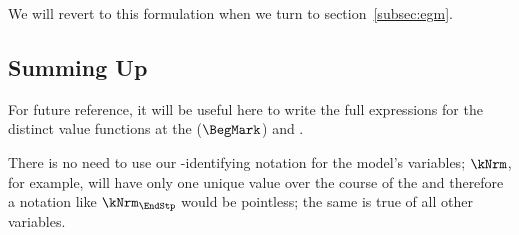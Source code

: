 \documentclass[\econtexRoot/SolvingMicroDSOPs]{subfiles}
\begin{document}
We will revert to this formulation when we turn to section~\ref{subsec:egm}.

\hypertarget{summing-up}{}
\subsection{Summing Up}\label{subsec:summing-up}
For future reference, it will be useful here to write the full expressions for the distinct value functions at the {\Arrival} ($\BegMark$) and {\Decision} {\moves}.  %

There is no need to use our {\interval}-identifying notation for the model's variables; $\kNrm$, for example, will have only one unique value over the course of the {\interval} and therefore a notation like $\kNrm_{\EndStp}$ would be pointless; the same is true of all other variables.
\end{document}
